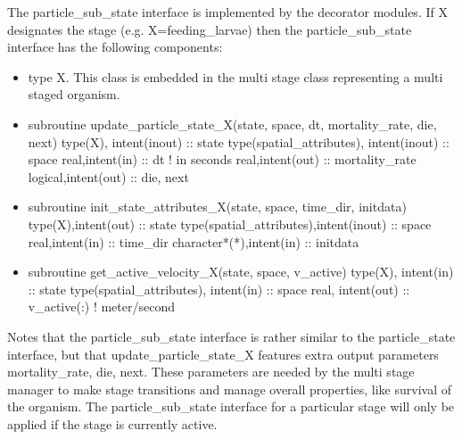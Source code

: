 The particle\_sub\_state interface is implemented by the decorator modules.
If X designates the stage (e.g. X=feeding\_larvae) then the particle\_sub\_state interface has the following 
components:
\begin{itemize}
  \item type X. This class is embedded in the multi stage class representing a multi staged organism.

 \item subroutine update\_particle\_state\_X(state, space, dt, mortality\_rate, die, next)  \newline
type(X), intent(inout)     :: state  \newline
type(spatial\_attributes), intent(inout) :: space  \newline
real,intent(in)                         :: dt ! in seconds  \newline
real,intent(out)                        :: mortality\_rate  \newline
logical,intent(out)                     :: die, next  \newline


 \item subroutine init\_state\_attributes\_X(state, space, time\_dir,  initdata)  \newline
type(X),intent(out)       :: state  \newline
type(spatial\_attributes),intent(inout) :: space  \newline
real,intent(in)                        :: time\_dir   \newline           
character*(*),intent(in)               :: initdata  \newline


 \item subroutine get\_active\_velocity\_X(state, space, v\_active)  \newline
type(X), intent(in)     :: state  \newline
type(spatial\_attributes), intent(in) :: space  \newline      
real, intent(out)                    :: v\_active(:) ! meter/second  \newline


\end{itemize}

Notes that the particle\_sub\_state interface is rather similar to the particle\_state interface, but that
update\_particle\_state\_X features extra output parameters mortality\_rate, die, next. These
parameters are needed by the multi stage manager to make stage transitions and manage overall
properties, like survival of the organism. The particle\_sub\_state interface for a particular stage will only
be applied if the stage is currently active.


